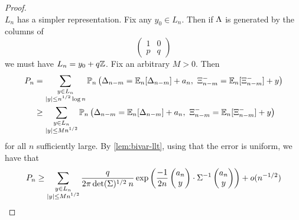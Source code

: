 \begin{proof}
\begin{equation*}
    \end{equation*}
    $L_n$ has a simpler representation. Fix any $y_0 \in L_n$. Then if $\Lambda$ is generated by the columns of
    \begin{equation*}
        \begin{pmatrix}
            1 & 0 \\
            p & q
        \end{pmatrix}
    \end{equation*}
    we must have $L_n = y_0 + q{\mathbb Z}$. Fix an arbitrary $M > 0$. Then
    \begin{align*}
        P_n &= \sum_{\substack{y \in L_n \\ \abs{y} \leq n^{1/2} \log n}} \mathbb P_n \left( \Delta_{n-m} = \E_n[\Delta_{n-m}] + a_n, \ \Xi^-_{n-m} = \E_n[\Xi^-_{n-m}] + y \right) \\
        &\geq \sum_{\substack{y \in L_n \\ \abs{y} \leq M n^{1/2}}} \mathbb P_n \left( \Delta_{n-m} = \E_n[\Delta_{n-m}] + a_n, \ \Xi^-_{n-m} = \E_n[\Xi^-_{n-m}] + y \right)
    \end{align*}
    for all $n$ sufficiently large. By \cref{lem:bivar-llt}, using that the error is uniform, we have that
    \begin{equation*}
        P_n \geq \sum_{\substack{y \in L_n \\ \lvert y\rvert \leq M n^{1/2}}} 
         \frac{q}{2\pi \det(\Sigma)^{1/2} \: n} \exp\left( 
            \frac{-1}{2n} \begin{pmatrix} a_n \\ y \end{pmatrix} \cdot \Sigma^{-1} \begin{pmatrix} a_n \\ y \end{pmatrix}
         \right)
         + o( n^{-1/2} )
    \end{equation*}


\end{proof}
